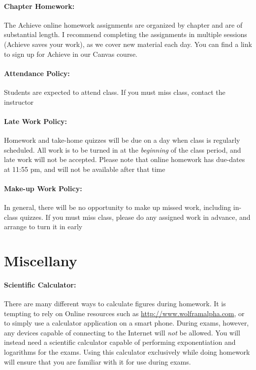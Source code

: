\documentclass[12pt, letterpaper]{article}
\begin{document}
\paragraph{Chapter Homework:}
The Achieve online homework assignments are organized by chapter and are of substantial length. I recommend completing the assignments in multiple sessions (Achieve saves your work), as we cover new material each day. You can find a link to sign up for Achieve in our Canvas course.

\paragraph{Attendance Policy:}
Students are expected to attend class. If you must miss class, contact the instructor

\paragraph{Late Work Policy:}
Homework and take-home quizzes will be due on a day when class is regularly scheduled. All work is to be turned in at the \emph{beginning} of the class period, and late work will not be accepted. Please note that online homework has due-dates at 11:55 pm, and will not be available after that time

\paragraph{Make-up Work Policy:}
In general, there will be no opportunity to make up missed work, including in-class quizzes. If you must miss class, please do any assigned work in advance, and arrange to turn it in early

\section*{Miscellany}

\paragraph{Scientific Calculator:}
There are many different ways to calculate figures during homework. It is tempting to rely on Online resources such as \href{http://www.wolframalpha.com}{http://www.wolframalpha.com}, or to simply use a calculator application on a smart phone. During exams, however, any devices capable of connecting to the Internet will \emph{not} be allowed. You will instead need a scientific calculator capable of performing exponentiation and logarithms for the exams. Using this calculator exclusively while doing homework will ensure that you are familiar with it for use during exams.
\end{document}
